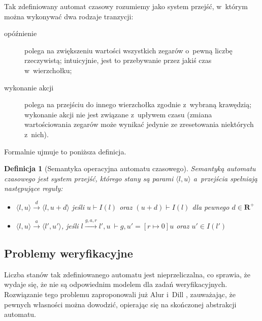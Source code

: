 \documentclass{pracamgr}
\newcommand{\pair}[2]{\langle #1, #2 \rangle}
\theoremstyle{plain}
\newtheorem{definition}{Definicja}
\begin{document}
Tak zdefiniowany automat czasowy rozumiemy jako
system przejść, w~którym można wykonywać dwa rodzaje tranzycji:
\begin{description}
  \item[opóźnienie] polega na zwiększeniu wartości wszystkich zegarów
  o~pewną liczbę rzeczywistą; intuicyjnie, jest to przebywanie przez
  jakiś czas w~wierzchołku;
  \item[wykonanie akcji] polega na przejściu do innego wierzchołka
  zgodnie z~wybraną krawędzią; wykonanie akcji nie jest związane
  z~upływem czasu (zmiana wartościowania zegarów może wynikać jedynie
  ze zresetowania niektórych z~nich).
\end{description}
Formalnie ujmuje to poniższa definicja.
\begin{definition}[Semantyka operacyjna automatu czasowego] Semantyką
  automatu czasowego jest system przejść, którego stany są parami
  $\pair{l}{u}$ a~przejścia spełniają następujące reguły:
  \begin{itemize}
    \item $\pair{l}{u} \stackrel{d}{\longrightarrow} \pair{l}{u+d}$
    jeśli $u \vdash I(l)$ oraz $(u+d) \vdash I(l)$ dla pewnego $d \in
    \mathbf{R}^{+}$
    \item $\pair{l}{u} \stackrel{a}{\longrightarrow} \pair{l'}{u'}$,
    jeśli $l \stackrel{g, a, r}{\longrightarrow} l', u~\vdash g, u' =
    [r \mapsto 0]u$ oraz $u' \in I(l')$
  \end{itemize}
\end{definition}

\subsection{Problemy weryfikacyjne}

Liczba stanów tak zdefiniowanego automatu jest nieprzeliczalna, co
sprawia, że wydaje się, że nie są odpowiednim modelem dla zadań
weryfikacyjnych. Rozwiązanie tego problemu zaproponowali już Alur
i~Dill \cite{alur-dill}, zauważając, że pewnych własności można dowodzić,
opierając się na skończonej abstrakcji automatu.
\end{document}
